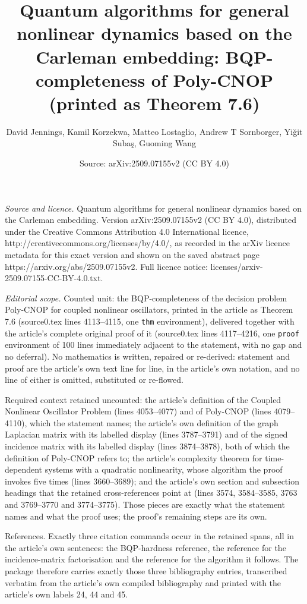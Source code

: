 \documentclass[10pt,a4paper]{amsart}
\title[Quantum algorithms for general nonlinear dynamics based on the Carleman embedding]{Quantum algorithms for general nonlinear dynamics based on the Carleman embedding: BQP-completeness of Poly-CNOP (printed as Theorem 7.6)}
\author{David Jennings, Kamil Korzekwa, Matteo Lostaglio, Andrew T Sornborger, Yi\u{g}it Suba\c{s}\dotlessi, Guoming Wang}
\date{Source: arXiv:2509.07155v2 (CC BY 4.0)}
\theoremstyle{plain}
\theoremstyle{definition}
\theoremstyle{remark}
\begin{document}
\maketitle

\noindent\emph{Source and licence.} Quantum algorithms for general nonlinear dynamics based on the Carleman embedding. Version arXiv:2509.07155v2 (CC BY 4.0), distributed under the Creative Commons Attribution 4.0 International licence, http://creativecommons.org/licenses/by/4.0/, as recorded in the arXiv licence metadata for this exact version and shown on the saved abstract page https://arxiv.org/abs/2509.07155v2. Full licence notice: licenses/arxiv-2509.07155-CC-BY-4.0.txt.\par\smallskip

\noindent\textit{Editorial scope.} Counted unit: the BQP-completeness of the decision problem Poly-CNOP for coupled nonlinear oscillators, printed in the article as Theorem 7.6 (source0.tex lines 4113--4115, one \texttt{thm} environment), delivered together with the article's complete original proof of it (source0.tex lines 4117--4216, one \texttt{proof} environment of 100 lines immediately adjacent to the statement, with no gap and no deferral). No mathematics is written, repaired or re-derived: statement and proof are the article's own text line for line, in the article's own notation, and no line of either is omitted, substituted or re-flowed.

Required context retained uncounted: the article's definition of the Coupled Nonlinear Oscillator Problem (lines 4053--4077) and of Poly-CNOP (lines 4079--4110), which the statement names; the article's own definition of the graph Laplacian matrix with its labelled display (lines 3787--3791) and of the signed incidence matrix with its labelled display (lines 3874--3878), both of which the definition of Poly-CNOP refers to; the article's complexity theorem for time-dependent systems with a quadratic nonlinearity, whose algorithm the proof invokes five times (lines 3660--3689); and the article's own section and subsection headings that the retained cross-references point at (lines 3574, 3584--3585, 3763 and 3769--3770 and 3774--3775). Those pieces are exactly what the statement names and what the proof uses; the proof's remaining steps are its own.

References. Exactly three citation commands occur in the retained spans, all in the article's own sentences: the BQP-hardness reference, the reference for the incidence-matrix factorisation and the reference for the algorithm it follows. The package therefore carries exactly those three bibliography entries, transcribed verbatim from the article's own compiled bibliography and printed with the article's own labels 24, 44 and 45.
\end{document}
